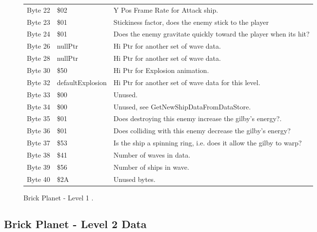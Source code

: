 \begin{figure}[H]
{\begin{adjustbox}{width=12cm}
\begin{tabular}{lll}
 Byte 22 & \$02               & Y Pos Frame Rate for Attack ship.                                  \\
 Byte 23 & \$01               & Stickiness factor, does the enemy stick to the player              \\
 Byte 24 & \$01               & Does the enemy gravitate quickly toward the player when its hit?   \\
 Byte 26 & nullPtr           & Hi Ptr for another set of wave data.                               \\
 Byte 28 & nullPtr           & Hi Ptr for another set of wave data.                               \\
 Byte 30 & \$50               & Hi Ptr for Explosion animation.                                    \\
 Byte 32 & defaultExplosion  & Hi Ptr for another set of wave data for this level.                \\
 Byte 33 & \$00               & Unused.                                                            \\
 Byte 34 & \$00               & Unused, see GetNewShipDataFromDataStore.                           \\
 Byte 35 & \$01               & Does destroying this enemy increase the gilby's energy?.           \\
 Byte 36 & \$01               & Does colliding with this enemy decrease the gilby's energy?        \\
 Byte 37 & \$53               & Is the ship a spinning ring, i.e. does it allow the gilby to warp? \\
 Byte 38 & \$41               & Number of waves in data.                                           \\
 Byte 39 & \$56               & Number of ships in wave.                                           \\
 Byte 40 & \$2A               & Unused bytes.                                                      \\
\bottomrule
\end{tabular}

  \end{adjustbox}

  }\caption*{Brick Planet - Level 1
.}
\end{figure}

\clearpage
\subsection{Brick Planet - Level 2 Data}

